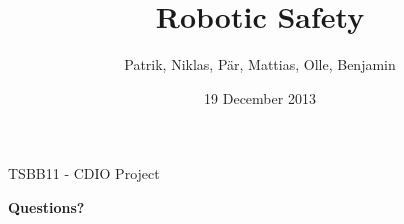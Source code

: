 \documentclass{beamer}
\title[Mister Roboto]{Robotic Safety}
\author{Patrik, Niklas, Pär, Mattias, Olle, Benjamin}
\institute{Computer Vision}
\date{19 December 2013 }
\begin{document}
\begin{frame}{TSBB11 - CDIO Project}
	\titlepage
\end{frame}












\begin{frame}
	\Huge
	\centering
	\textbf{Questions?}
\end{frame}
 
\end{document}

